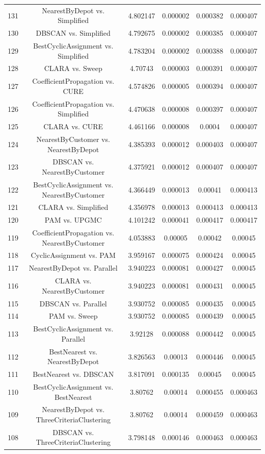 \documentclass[a4paper,10pt]{article}
\begin{document}
\begin{landscape}
\begin{table}[!htp]
\begin{tabular}{cccccc}
131&NearestByDepot vs. Simplified&4.802147&0.000002&0.000382&0.000407\\
130&DBSCAN vs. Simplified&4.792675&0.000002&0.000385&0.000407\\
129&BestCyclicAssignment vs. Simplified&4.783204&0.000002&0.000388&0.000407\\
128&CLARA vs. Sweep&4.70743&0.000003&0.000391&0.000407\\
127&CoefficientPropagation vs. CURE&4.574826&0.000005&0.000394&0.000407\\
126&CoefficientPropagation vs. Simplified&4.470638&0.000008&0.000397&0.000407\\
125&CLARA vs. CURE&4.461166&0.000008&0.0004&0.000407\\
124&NearestByCustomer vs. NearestByDepot&4.385393&0.000012&0.000403&0.000407\\
123&DBSCAN vs. NearestByCustomer&4.375921&0.000012&0.000407&0.000407\\
122&BestCyclicAssignment vs. NearestByCustomer&4.366449&0.000013&0.00041&0.000413\\
121&CLARA vs. Simplified&4.356978&0.000013&0.000413&0.000413\\
120&PAM vs. UPGMC&4.101242&0.000041&0.000417&0.000417\\
119&CoefficientPropagation vs. NearestByCustomer&4.053883&0.00005&0.00042&0.00045\\
118&CyclicAssignment vs. PAM&3.959167&0.000075&0.000424&0.00045\\
117&NearestByDepot vs. Parallel&3.940223&0.000081&0.000427&0.00045\\
116&CLARA vs. NearestByCustomer&3.940223&0.000081&0.000431&0.00045\\
115&DBSCAN vs. Parallel&3.930752&0.000085&0.000435&0.00045\\
114&PAM vs. Sweep&3.930752&0.000085&0.000439&0.00045\\
113&BestCyclicAssignment vs. Parallel&3.92128&0.000088&0.000442&0.00045\\
112&BestNearest vs. NearestByDepot&3.826563&0.00013&0.000446&0.00045\\
111&BestNearest vs. DBSCAN&3.817091&0.000135&0.00045&0.00045\\
110&BestCyclicAssignment vs. BestNearest&3.80762&0.00014&0.000455&0.000463\\
109&NearestByDepot vs. ThreeCriteriaClustering&3.80762&0.00014&0.000459&0.000463\\
108&DBSCAN vs. ThreeCriteriaClustering&3.798148&0.000146&0.000463&0.000463\\

\end{tabular}
\end{table}
\end{landscape}
\end{document}
